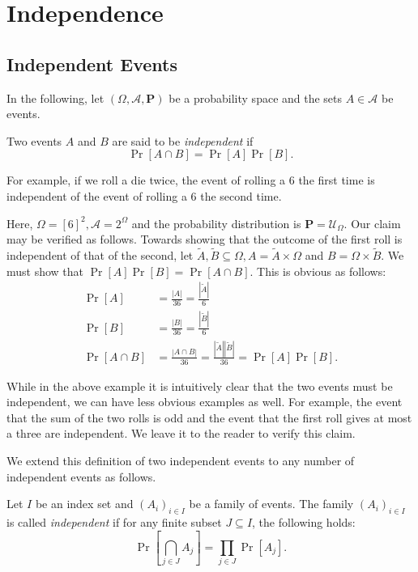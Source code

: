 \section{Independence}

\subsection{Independent Events}

In the following, let $(\Omega,\mathcal{A},\textbf{P})$ be a probability space and the sets $A\in\mathcal{A}$ be events.
    
\begin{definition}
    Two events $A$ and $B$ are said to be \textit{independent} if
    $$\Pr[A\cap B] = \Pr[A]\Pr[B].$$
\end{definition}

For example, if we roll a die twice, the event of rolling a $6$ the first time is independent of the event of rolling a $6$ the second time.

Here, $\Omega=[6]^2, \mathcal{A}=2^\Omega$ and the probability distribution is $\textbf{P}=\mathcal{U}_\Omega$. Our claim may be verified as follows. Towards showing that the outcome of the first roll is independent of that of the second, let $\tilde A,\tilde B\subseteq\Omega, A=\tilde A\times\Omega$ and $B=\Omega\times\tilde B$. We must show that $\Pr[A]\Pr[B]=\Pr[A\cap B]$. This is obvious as follows: 
\begin{align*}
    \Pr[A] &= \frac{|A|}{36}=\frac{|\tilde A|}{6} \\
    \Pr[B] &= \frac{|B|}{36}=\frac{|\tilde B|}{6} \\
    \Pr[A\cap B] &= \frac{|A\cap B|}{36} = \frac{|\tilde A||\tilde B|}{36} = \Pr[A]\Pr[B].
\end{align*}

While in the above example it is intuitively clear that the two events must be independent, we can have less obvious examples as well. For example, the event that the sum of the two rolls is odd and the event that the first roll gives at most a three are independent. We leave it to the reader to verify this claim.

\vspace{2mm}
We extend this definition of two independent events to any number of independent events as follows.

\begin{definition}
    Let $I$ be an index set and $(A_i)_{i\in I}$ be a family of events. The family $(A_i)_{i\in I}$ is called \textit{independent} if for any finite subset $J\subseteq I$, the following holds:
    $$\Pr\left[\bigcap_{j\in J}A_j\right]=\prod_{j\in J}\Pr[A_j].$$
\end{definition}

